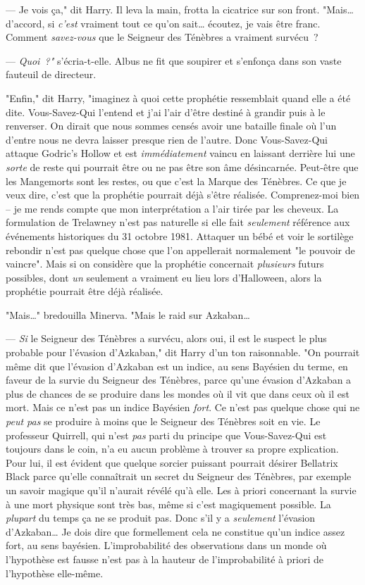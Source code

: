 --- Je vois ça," dit Harry. Il leva la main, frotta la cicatrice sur son front. "Mais… d'accord, si \emph{c'est} vraiment tout ce qu'on sait… écoutez, je vais être franc. Comment \emph{savez-vous} que le Seigneur des Ténèbres a vraiment survécu~?

--- \emph{Quoi~?"} s'écria-t-elle. Albus ne fit que soupirer et s'enfonça dans son vaste fauteuil de directeur.

"Enfin," dit Harry, "imaginez à quoi cette prophétie ressemblait quand elle a été dite. Vous-Savez-Qui l'entend et j'ai l'air d'être destiné à grandir puis à le renverser. On dirait que nous sommes censés avoir une bataille finale où l'un d'entre nous ne devra laisser presque rien de l'autre. Donc Vous-Savez-Qui attaque Godric's Hollow et est \emph{immédiatement} vaincu en laissant derrière lui une \emph{sorte} de reste qui pourrait être ou ne pas être son âme désincarnée. Peut-être que les Mangemorts sont les restes, ou que c'est la Marque des Ténèbres. Ce que je veux dire, c'est que la prophétie pourrait déjà s'être réalisée. Comprenez-moi bien -- je me rends compte que mon interprétation a l'air tirée par les cheveux. La formulation de Trelawney n'est pas naturelle si elle fait \emph{seulement} référence aux événements historiques du 31 octobre 1981. Attaquer un bébé et voir le sortilège rebondir n'est pas quelque chose que l'on appellerait normalement "le pouvoir de vaincre". Mais si on considère que la prophétie concernait \emph{plusieurs} futurs possibles, dont \emph{un} seulement a vraiment eu lieu lors d'Halloween, alors la prophétie pourrait être déjà réalisée.

"Mais…" bredouilla Minerva. "Mais le raid sur Azkaban…

--- \emph{Si} le Seigneur des Ténèbres a survécu, alors oui, il est le suspect le plus probable pour l'évasion d'Azkaban," dit Harry d'un ton raisonnable. "On pourrait même dit que l'évasion d'Azkaban est un indice, au sens Bayésien du terme, en faveur de la survie du Seigneur des Ténèbres, parce qu'une évasion d'Azkaban a plus de chances de se produire dans les mondes où il vit que dans ceux où il est mort. Mais ce n'est pas un indice Bayésien \emph{fort}. Ce n'est pas quelque chose qui ne \emph{peut pas} se produire à moins que le Seigneur des Ténèbres soit en vie. Le professeur Quirrell, qui n'est \emph{pas} parti du principe que Vous-Savez-Qui est toujours dans le coin, n'a eu aucun problème à trouver sa propre explication. Pour lui, il est évident que quelque sorcier puissant pourrait désirer Bellatrix Black parce qu'elle connaîtrait un secret du Seigneur des Ténèbres, par exemple un savoir magique qu'il n'aurait révélé qu'à elle. Les à priori concernant la survie à une mort physique sont très bas, même si c'est magiquement possible. La \emph{plupart} du temps ça ne se produit pas. Donc s'il y a \emph{seulement} l'évasion d'Azkaban… Je dois dire que formellement cela ne constitue qu'un indice assez fort, au sens bayésien. L'improbabilité des observations dans un monde où l'hypothèse est fausse n'est pas à la hauteur de l'improbabilité à priori de l'hypothèse elle-même.

